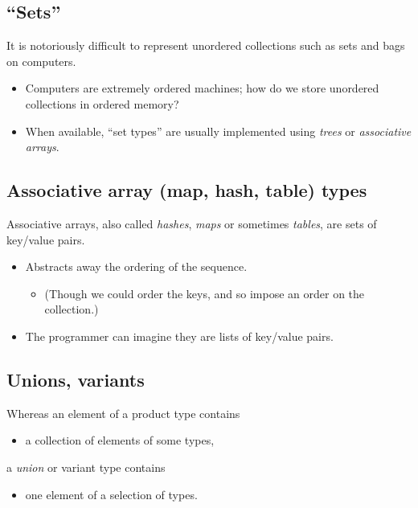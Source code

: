 \documentclass[11pt]{article}
\theoremstyle{definition}
\begin{document}
\subsection{“Sets”}
\label{sec:orgf8503c5}

It is notoriously difficult to represent unordered collections
such as sets and bags on computers.
\begin{itemize}
\item Computers are extremely ordered machines; how do we store
unordered collections in ordered memory?
\item When available, “set types” are usually implemented
using \emph{trees} or \emph{associative arrays}.
\end{itemize}

\subsection{Associative array (map, hash, table) types}
\label{sec:orga2dd922}

Associative arrays, also called \emph{hashes}, \emph{maps} or sometimes \emph{tables},
are sets of key/value pairs.
\begin{itemize}
\item Abstracts away the ordering of the sequence.
\begin{itemize}
\item (Though we could order the keys, and so impose
an order on the collection.)
\end{itemize}
\item The programmer can imagine they are lists of key/value pairs.
\end{itemize}

\subsection{Unions, variants}
\label{sec:org5056c45}

Whereas an element of a product type contains
\begin{itemize}
\item a collection of elements of some types,
\end{itemize}
a \emph{union} or variant type contains
\begin{itemize}
\item one element of a selection of types.
\end{itemize}
\end{document}
